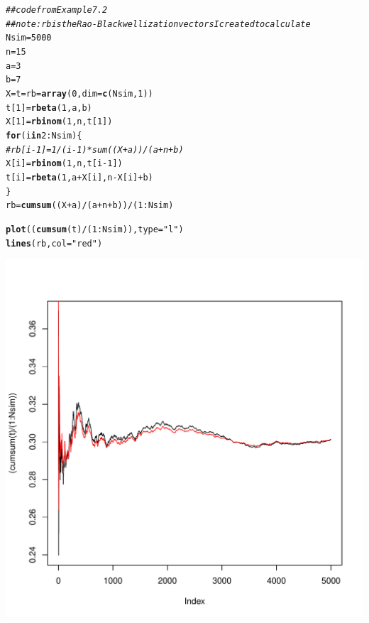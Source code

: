 \documentclass{article}\usepackage[]{graphicx}\usepackage[]{color}
\makeatletter
\newcommand{\hlnum}[1]{\textcolor[rgb]{0.686,0.059,0.569}{#1}}%
\newcommand{\hlstr}[1]{\textcolor[rgb]{0.192,0.494,0.8}{#1}}%
\newcommand{\hlcom}[1]{\textcolor[rgb]{0.678,0.584,0.686}{\textit{#1}}}%
\newcommand{\hlopt}[1]{\textcolor[rgb]{0,0,0}{#1}}%
\newcommand{\hlstd}[1]{\textcolor[rgb]{0.345,0.345,0.345}{#1}}%
\newcommand{\hlkwa}[1]{\textcolor[rgb]{0.161,0.373,0.58}{\textbf{#1}}}%
\newcommand{\hlkwb}[1]{\textcolor[rgb]{0.69,0.353,0.396}{#1}}%
\newcommand{\hlkwc}[1]{\textcolor[rgb]{0.333,0.667,0.333}{#1}}%
\newcommand{\hlkwd}[1]{\textcolor[rgb]{0.737,0.353,0.396}{\textbf{#1}}}%
\newenvironment{kframe}{%
 \def\at@end@of@kframe{}%
 \ifinner\ifhmode%
  \def\at@end@of@kframe{\end{minipage}}%
  \begin{minipage}{\columnwidth}%
 \fi\fi%
 \def\FrameCommand##1{\hskip\@totalleftmargin \hskip-\fboxsep
 \colorbox{shadecolor}{##1}\hskip-\fboxsep
     \hskip-\linewidth \hskip-\@totalleftmargin \hskip\columnwidth}%
 \MakeFramed {\advance\hsize-\width
   \@totalleftmargin\z@ \linewidth\hsize
   \@setminipage}}%
 {\par\unskip\endMakeFramed%
 \at@end@of@kframe}
\newenvironment{knitrout}{}{} %
\makeatother
\begin{document}
\begin{knitrout}
\color{fgcolor}\begin{kframe}
\begin{alltt}
\hlcom{## code from Example 7.2}
\hlcom{## note: rb is the Rao-Blackwellization vectors I created to calculate}
\hlstd{Nsim}\hlkwb{=}\hlnum{5000}
\hlstd{n}\hlkwb{=}\hlnum{15}
\hlstd{a}\hlkwb{=}\hlnum{3}
\hlstd{b}\hlkwb{=}\hlnum{7}
\hlstd{X}\hlkwb{=}\hlstd{t}\hlkwb{=}\hlstd{rb}\hlkwb{=}\hlkwd{array}\hlstd{(}\hlnum{0}\hlstd{,}\hlkwc{dim}\hlstd{=}\hlkwd{c}\hlstd{(Nsim,}\hlnum{1}\hlstd{))}
\hlstd{t[}\hlnum{1}\hlstd{]}\hlkwb{=}\hlkwd{rbeta}\hlstd{(}\hlnum{1}\hlstd{,a,b)}
\hlstd{X[}\hlnum{1}\hlstd{]}\hlkwb{=}\hlkwd{rbinom}\hlstd{(}\hlnum{1}\hlstd{,n,t[}\hlnum{1}\hlstd{])}
 \hlkwa{for} \hlstd{(i} \hlkwa{in} \hlnum{2}\hlopt{:}\hlstd{Nsim)\{}
  \hlcom{#rb[i-1] = 1/(i-1)*sum((X+a))/(a+n+b)}
  \hlstd{X[i]}\hlkwb{=}\hlkwd{rbinom}\hlstd{(}\hlnum{1}\hlstd{,n,t[i}\hlopt{-}\hlnum{1}\hlstd{])}
  \hlstd{t[i]}\hlkwb{=}\hlkwd{rbeta}\hlstd{(}\hlnum{1}\hlstd{,a}\hlopt{+}\hlstd{X[i],n}\hlopt{-}\hlstd{X[i]}\hlopt{+}\hlstd{b)}
 \hlstd{\}}
  \hlstd{rb} \hlkwb{=} \hlkwd{cumsum}\hlstd{((X}\hlopt{+}\hlstd{a)}\hlopt{/}\hlstd{(a}\hlopt{+}\hlstd{n}\hlopt{+}\hlstd{b))}\hlopt{/}\hlstd{(}\hlnum{1}\hlopt{:}\hlstd{Nsim)}

\hlkwd{plot}\hlstd{((}\hlkwd{cumsum}\hlstd{(t)}\hlopt{/}\hlstd{(}\hlnum{1}\hlopt{:}\hlstd{Nsim)),}\hlkwc{type}\hlstd{=}\hlstr{"l"}\hlstd{)}
\hlkwd{lines}\hlstd{(rb,}\hlkwc{col}\hlstd{=}\hlstr{"red"}\hlstd{)}
\end{alltt}
\end{kframe}
\includegraphics[width=0.60\linewidth]{figure/unnamed-chunk-2-1} 

\end{knitrout}
\end{document}
